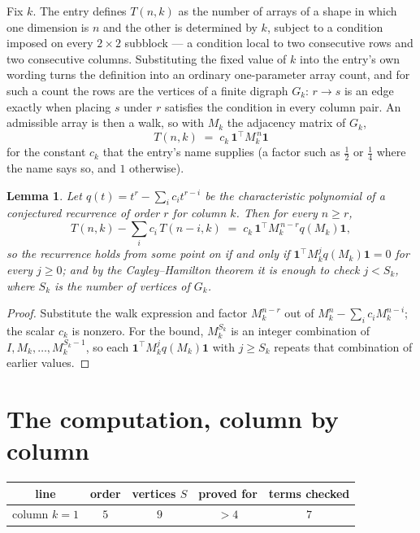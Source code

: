 \documentclass[11pt,a4paper]{article}
\theoremstyle{plain}
\newtheorem{lemma}[theorem]{Lemma}
\theoremstyle{definition}
\begin{document}
Fix $k$. The entry defines $T(n,k)$ as the number of arrays of a shape in which one dimension
is $n$ and the other is determined by $k$, subject to a condition imposed on every
$2\times2$ subblock --- a condition local to two consecutive rows and two consecutive columns.
Substituting the fixed value of $k$ into the entry's own wording turns the definition into an
ordinary one-parameter array count, and for such a count the rows are the vertices of a finite
digraph $G_k$: $r\to s$ is an edge exactly when placing $s$ under $r$ satisfies the condition
in every column pair. An admissible array is then a walk, so with $M_k$ the adjacency matrix
of $G_k$,
\[
T(n,k)\;=\;c_k\,\mathbf{1}^{\!\top}M_k^{\,n}\mathbf{1}
\]
for the constant $c_k$ that the entry's name supplies (a factor such as $\tfrac12$ or
$\tfrac14$ where the name says so, and $1$ otherwise).

\begin{lemma}\label{lem:crit}
Let $q(t)=t^{r}-\sum_i c_it^{r-i}$ be the characteristic polynomial of a conjectured
recurrence of order $r$ for column $k$. Then for every $n\ge r$,
\[
T(n,k)-\sum_i c_i\,T(n-i,k)\;=\;c_k\,\mathbf{1}^{\!\top}M_k^{\,n-r}q(M_k)\mathbf{1},
\]
so the recurrence holds from some point on if and only if
$\mathbf{1}^{\!\top}M_k^{j}q(M_k)\mathbf{1}=0$ for every $j\ge0$; and by the
Cayley--Hamilton theorem it is enough to check $j<S_k$, where $S_k$ is the number of vertices
of $G_k$.
\end{lemma}

\begin{proof}
Substitute the walk expression and factor $M_k^{n-r}$ out of $M_k^{n}-\sum_ic_iM_k^{n-i}$;
the scalar $c_k$ is nonzero. For the bound, $M_k^{S_k}$ is an integer combination of
$I,M_k,\dots,M_k^{S_k-1}$, so each $\mathbf{1}^{\!\top}M_k^{j}q(M_k)\mathbf{1}$ with
$j\ge S_k$ repeats that combination of earlier values.
\end{proof}

\section{The computation, column by column}

\begin{center}
\begin{tabular}{ccccc}
line & order & vertices $S$ & proved for & terms checked \\ \hline
column $k$$=1$ & $5$ & $9$ & $>4$ & $7$ \\
\end{tabular}
\end{center}
\end{document}
